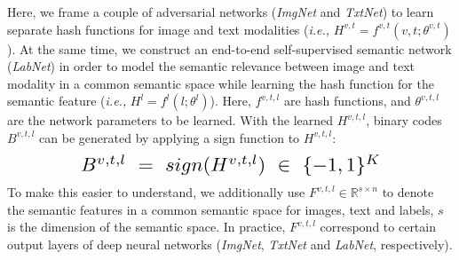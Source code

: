 \documentclass[10pt,twocolumn,letterpaper]{article}
\begin{document}
Here, we frame a couple of adversarial networks (\emph{ImgNet} and \emph{TxtNet}) to learn separate hash functions for image and text modalities (\emph{i.e.,} $H^{v,t}=f^{v,t}(v,t;\theta^{v,t})$). At the same time, we construct an end-to-end self-supervised semantic network (\emph{LabNet}) in order to model the semantic relevance between image and text modality in a common semantic space while learning the hash function for the semantic feature (\emph{i.e.,} $H^{l}=f^{l}(l;\theta^{l})$). Here, $f^{v,t,l}$ are hash functions, and $\theta^{v,t,l}$ are the network parameters to be learned. With the learned $H^{v,t,l}$, binary codes $B^{v,t,l}$ can be generated by applying a sign function to $H^{v,t,l}$:
\vspace{-0.1cm}
\begin{equation} \label{eq: hashing code}
\begin{aligned}
\resizebox{0.7\hsize}{!}{$B^{v,t,l} \ = \ sign(H^{v,t,l})\ \in \ \{-1,1\}^{K}$}\\
\end{aligned}
\vspace{-0.1cm}
\end{equation}
To make this easier to understand, we additionally use $F^{v,t,l} \in \mathbb{R}^{s\times n}$ to denote the semantic features in a common semantic space for images, text and labels, $s$ is the dimension of the semantic space. In practice, $F^{v,t,l}$ correspond to certain output layers of deep neural networks (\emph{ImgNet}, \emph{TxtNet} and \emph{LabNet}, respectively).
\vspace{-0.1cm}
\end{document}
